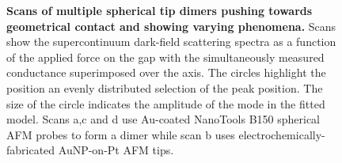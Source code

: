 \documentclass[a4paper]{article}
\begin{document}
\begin{figure}[p]
\caption[Scans of multiple spherical tip dimers pushing towards geometrical contact and showing varying phenomena]{\textbf{Scans of multiple spherical tip dimers pushing towards geometrical contact and showing varying phenomena.} Scans show the supercontinuum dark-field scattering spectra as a function of the applied force on the gap with the simultaneously measured conductance superimposed over the axis. The circles highlight the position an evenly distributed selection of the peak position. The size of the circle indicates the amplitude of the mode in the fitted model. Scans a,c and d use Au-coated NanoTools B150 spherical AFM probes to form a dimer while scan b uses electrochemically-fabricated AuNP-on-Pt AFM tips.}
\label{fig:spherical_tip_scans}
\end{figure}
\end{document}
